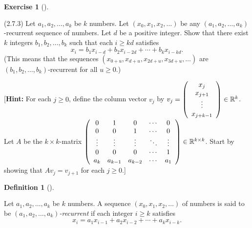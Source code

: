 \documentclass[numbers=enddot,12pt,final,onecolumn,notitlepage]{scrartcl}
\newcounter{exer}
\theoremstyle{definition}
\newtheorem{defi}[theo]{Definition}
\newenvironment{definition}[1][]
{\begin{defi}[#1]\begin{leftbar}}
        {\end{leftbar}\end{defi}}
\newtheorem{exmp}[exer]{Exercise}
\newenvironment{exercise}[1][]
{\begin{exmp}[#1]\begin{leftbar}}
        {\end{leftbar}\end{exmp}}
\begin{document}
\begin{exercise}
	\label{exe.schurtri.ch.lin-rec-kd} (2.7.3) Let $a_{1},a_{2},\ldots,a_{k}$ be
	$k$ numbers. Let $\left(  x_{0},x_{1},x_{2},\ldots\right)  $ be any $\left(
		a_{1},a_{2},\ldots,a_{k}\right)  $-recurrent sequence of numbers. Let $d$ be a
	positive integer. Show that there exist $k$ integers $b_{1},b_{2},\ldots
		,b_{k}$ such that each $i\geq kd$ satisfies%
	\[
		x_{i}=b_{1}x_{i-d}+b_{2}x_{i-2d}+\cdots+b_{k}x_{i-kd}.
	\]
	(This means that the sequences $\left(  x_{0+u},x_{d+u},x_{2d+u}%
		,x_{3d+u},\ldots\right)  $ are $\left(  b_{1},b_{2},\ldots,b_{k}\right)
	$-recurrent for all $u\geq0$.)

	[\textbf{Hint:} For each $j\geq0$, define the column vector $v_{j}$ by
	$v_{j}=\left(
		\begin{array}
				[c]{c}%
				x_{j}   \\
				x_{j+1} \\
				\vdots  \\
				x_{j+k-1}%
			\end{array}
		\right)  \in\mathbb{R}^{k}$. Let $A$ be the $k\times k$-matrix $\left(
		\begin{array}
				[c]{ccccc}%
				0      & 1       & 0       & \cdots & 0      \\
				0      & 0       & 1       & \cdots & 0      \\
				\vdots & \vdots  & \vdots  & \ddots & \vdots \\
				0      & 0       & 0       & \cdots & 1      \\
				a_{k}  & a_{k-1} & a_{k-2} & \cdots & a_{1}  %
			\end{array}
		\right)  \in\mathbb{R}^{k\times k}$. Start by showing that $Av_{j}=v_{j+1}$
	for each $j\geq0$.]

	\begin{definition}
		Let $a_{1},a_{2},\ldots,a_{k}$ be $k$ numbers. A sequence $\left(  x_{0}%
			,x_{1},x_{2},\ldots\right)  $ of numbers is said to be $\left(  a_{1}%
			,a_{2},\ldots,a_{k}\right)  $\emph{-recurrent} if each integer $i\geq k$
		satisfies%
		\[
			x_{i}=a_{1}x_{i-1}+a_{2}x_{i-2}+\cdots+a_{k}x_{i-k}.
		\]

	\end{definition}
\end{exercise}
\end{document}
